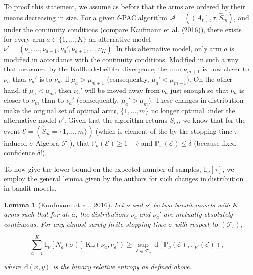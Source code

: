 \documentclass[12pt,]{article}
\newtheorem{lemma}{Lemma}
\newcommand{\KL}{\,\text{KL}}
\newcommand{\der}{\,\text{d}}
\begin{document}
To proof this statement, we assume as before that the arms are ordered
by their means decreasing in size. For a given \(\delta\)-PAC algorithm
\(\mathcal{A} = ((A_t), \tau, \hat{S}_m)\), and under the continuity
conditions (compare Kaufmann et al. (2016)), there exists for every arm
\(a \in \{1, \dots, K\}\) an alternative model
\(\nu' = (\nu_1, \dots, \nu_{a-1}, \nu_a', \nu_{a+1}, \dots, \nu_K)\).
In this alternative model, only arm \(a\) is modified in accordance with
the continuity conditions. Modified in such a way that measured by the
Kullback-Leibler divergence, the arm \(\nu_{m+1}\) is now closer to
\(\nu_a\) than \(\nu_a'\) is to \(\nu_a\), if \(\mu_a > \mu_{m+1}\)
(consequently, \(\mu_a' < \mu_{m+1}\)). On the other hand, if
\(\mu_a < \mu_{m}\), then \(\nu_a'\) will be moved away from \(\nu_a\)
just enough so that \(\nu_a\) is closer to \(\nu_m\) than to \(\nu_a'\)
(consequently, \(\mu_a' > \mu_m\)). These changes in distribution make
the original set of optimal arms, \(\{1,\dots,m\}\) no longer optimal
under the alternative model \(\nu'\). Given that the algorithm returns
\(\hat{S}_m\), we know that for the event
\(\mathcal{E} = (\hat{S}_m = \{1, \dots, m\})\) (which is element of the
by the stopping time \(\tau\) induced \(\sigma\)-Algebra
\(\mathcal{F}_{\tau}\)), that
\(\mathbb{P}_{\nu}(\mathcal{E}) \geq 1-\delta\) and
\(\mathbb{P}_{\nu'}(\mathcal{E}) \leq \delta\) (because fixed confidence
\(\delta\)!).

To now give the lower bound on the expected number of samples,
\(\mathbb{E}_{\nu}[\tau]\), we employ the general lemma given by the
authors for such changes in distribution in bandit models.

\begin{lemma}[Kaufmann et al., 2016] \label{theorem:KaufmannEtAlLemma1}
Let $\nu$ and $\nu'$ be two bandit models with $K$ arms such that for all $a$, the distributions $\nu_a$ and $\nu_a'$ are mutually absolutely continuous. For any almost-surely finite stopping time $\sigma$ with respect to $(\mathcal{F}_t)$,

\begin{equation*}
\sum_{a=1}^{K} \mathbb{E}_{\nu} [N_a(\sigma)] \KL(\nu_a, \nu_a') \geq \sup_{\mathcal{E} \in \mathcal{F}_{\sigma}} \der (\mathbb{P}_{\nu}(\mathcal{E}), \mathbb{P}_{\nu'}(\mathcal{E})),
\end{equation*}

where $\der(x,y)$ is the binary relative entropy as defined above.
\end{lemma}
\end{document}
